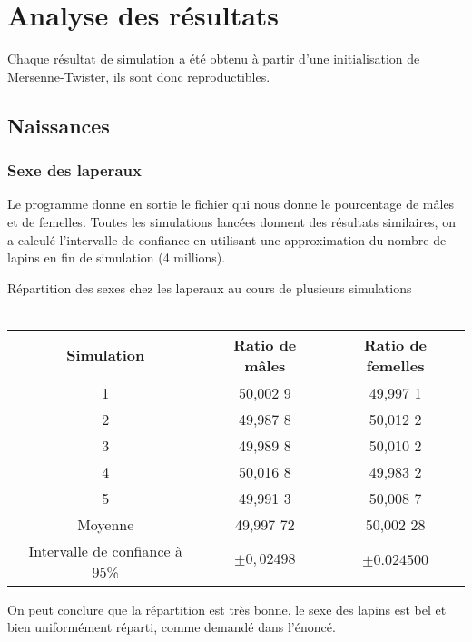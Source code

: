 \documentclass[11)pt,a4paper]{article}
\begin{document}
\section{Analyse des résultats}
    Chaque résultat de simulation a été obtenu à partir d'une initialisation de Mersenne-Twister, ils sont donc reproductibles.
    \subsection{Naissances}
        \subsubsection{Sexe des laperaux}
            Le programme donne en sortie le fichier  qui nous donne le pourcentage de mâles et de femelles.
            Toutes les simulations lancées donnent des résultats similaires, on a calculé l'intervalle de confiance en utilisant 
            une approximation du nombre de lapins en fin de simulation (4 millions).
            \par
            \begin{center} 
                Répartition des sexes chez les laperaux au cours de plusieurs simulations
                \\\hfill\\
                \begin{tabular}{|c|c|c|}
                    \hline
                    Simulation & Ratio de mâles & Ratio de femelles\\
                    \hline
                    1 & 50,002 9 & 49,997 1\\
                    \hline
                    2 & 49,987 8 & 50,012 2\\
                    \hline
                    3 & 49,989 8 & 50,010 2\\
                    \hline
                    4 & 50,016 8 & 49,983 2\\
                    \hline
                    5 & 49,991 3 & 50,008 7\\
                    \hline
                    Moyenne & 49,997 72 & 50,002 28\\
                    \hline
                    Intervalle de confiance à 95\% & $\pm 0,02 498$ & $\pm 0.024 500$\\
                    \hline
                \end{tabular} 
            \end{center}
            On peut conclure que la répartition est très bonne, le sexe des lapins est bel et bien uniformément réparti, comme demandé dans l'énoncé.
\end{document}
